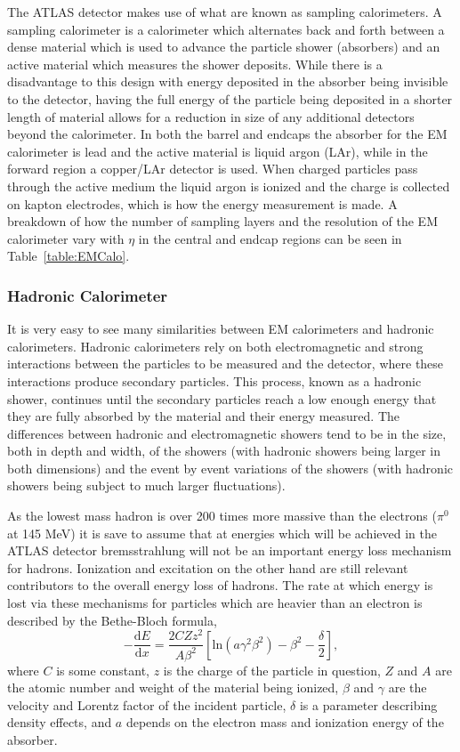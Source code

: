
The ATLAS detector makes use of what are known as sampling calorimeters.  
A sampling calorimeter is a calorimeter which alternates back and forth between a dense material which is used to advance the particle shower (absorbers) and an active material which measures the shower deposits.  
While there is a disadvantage to this design with energy deposited in the absorber being invisible to the detector, having the full energy of the particle being deposited in a shorter length of material allows for a reduction in size of any additional detectors beyond the calorimeter.  
In both the barrel and endcaps the absorber for the EM calorimeter is lead and the active material is liquid argon (LAr), while in the forward region a copper/LAr detector is used.  
When charged particles pass through the active medium the liquid argon is ionized and the charge is collected on kapton electrodes, which is how the energy measurement is made.  
A breakdown of how the number of sampling layers and the resolution of the EM calorimeter vary with $\eta$ in the central and endcap regions can be seen in Table~\ref{table:EMCalo}.  


\subsubsection{Hadronic Calorimeter}
\label{Had}
It is very easy to see many similarities between EM calorimeters and hadronic calorimeters.  
Hadronic calorimeters rely on both electromagnetic and strong interactions between the particles to be measured and the detector, where these interactions produce secondary particles.  
This process, known as a hadronic shower, continues until the secondary particles reach a low enough energy that they are fully absorbed by the material and their energy measured.  
The differences between hadronic and electromagnetic showers tend to be in the size, both in depth and width, of the showers (with hadronic showers being larger in both dimensions) and the event by event variations of the showers (with hadronic showers being subject to much larger fluctuations).  

As the lowest mass hadron is over 200 times more massive than the electrons ($\pi^{0}$ at 145 MeV) it is save to assume that at energies which will be achieved in the ATLAS detector bremsstrahlung will not be an important energy loss mechanism for hadrons.  
Ionization and excitation on the other hand are still relevant contributors to the overall energy loss of hadrons.  
The rate at which energy is lost via these mechanisms for particles which are heavier than an electron is described by the Bethe-Bloch formula,  
\begin{equation}
-\frac{\mathrm{d}E}{\mathrm{d}x}=\frac{2CZz^2}{A\beta^2}\left[\mathrm{ln}\left(a\gamma^2\beta^2\right)-\beta^2-\frac{\delta}{2}\right], 
\end{equation}
where $C$ is some constant, $z$ is the charge of the particle in question, $Z$ and $A$ are the atomic number and weight of the material being ionized, $\beta$ and $\gamma$ are the velocity and Lorentz factor of the incident particle, $\delta$ is a parameter describing density effects, and $a$ depends on the electron mass and ionization energy of the absorber.  

